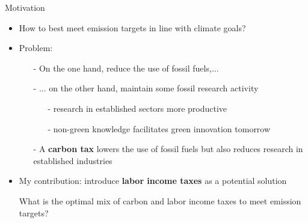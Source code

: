 \documentclass[11pt,aspectratio=169]{beamer}
\begin{document}
\addtocounter{framenumber}{-1}
\begin{frame}{Motivation}
	\begin{itemize}[<+-| alert@+>]
		\item How to best meet emission targets in line with climate goals? %
		\vspace{3mm}
		\item Problem:
		\begin{itemize}
			\item[-] On the one hand,  reduce the use of fossil fuels,...
			\vspace{2mm}
			\item[-] ... on the other hand, %
			maintain some fossil research activity 
			\vspace{1mm}
			\begin{enumerate}
				\item[-] research in established sectors more productive
				\item[-] non-green knowledge facilitates green innovation tomorrow %
			\end{enumerate}%
			\vspace{2mm}				
			\item[-] A \textbf{carbon tax} lowers the use of fossil fuels but also reduces research in established industries %
		\end{itemize} 
		\vspace{3mm}
		\item My contribution: introduce \textbf{labor income taxes} as a potential solution
		\vspace{3mm}
		\item[] \hspace{-4mm}\alert{{What is the optimal mix of carbon and labor income taxes to meet emission targets?}}
	\end{itemize}
\end{frame}
\end{document}
